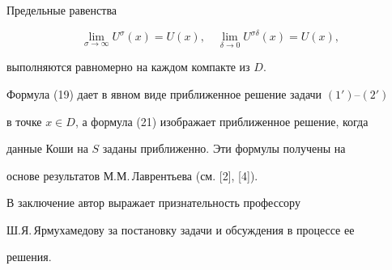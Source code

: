  


 


\begin{cor} 


Предельные равенства 


$$ 


\lim_{\sigma\to\infty}U^\sigma(x)=U(x),\quad 


\lim_{\delta\to0}U^{\sigma\delta}(x)=U(x), 


$$ 


выполняются равномерно на каждом компакте из $D$. 


\end{cor} 


 


 


Формула (19) дает в явном виде приближенное решение задачи $(1')$--$(2')$ 


в точке $x\in D$, а формула (21) изображает приближенное решение, когда 


данные Коши на $S$ заданы приближенно. Эти формулы получены на 


основе результатов М.М.\,Лаврентьева (см. [2], [4]). 


 


В заключение автор выражает признательность профессору 


Ш.Я.\,Ярмухамедову за постановку задачи и обсуждения в процессе ее 


решения. 


 


 


